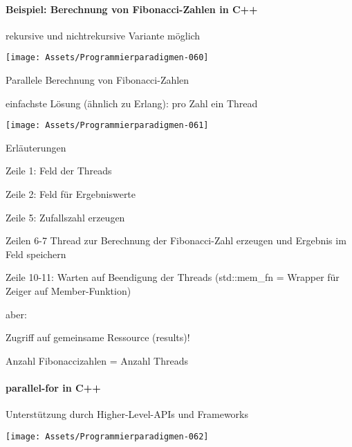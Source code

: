 \documentclass[10pt]{article}
\begin{document}
\paragraph{Beispiel: Berechnung von Fibonacci-Zahlen in C++}
\begin{itemize*}
  \item rekursive und nichtrekursive Variante möglich
\end{itemize*}
\begin{center}
  \texttt{[image: Assets/Programmierparadigmen-060]}
\end{center}

Parallele Berechnung von Fibonacci-Zahlen
\begin{itemize*}
  \item einfachste Lösung (ähnlich zu Erlang): pro Zahl ein Thread
\end{itemize*}
\begin{center}
  \texttt{[image: Assets/Programmierparadigmen-061]}
\end{center}

Erläuterungen
\begin{itemize*}
  \item Zeile 1: Feld der Threads
  \item Zeile 2: Feld für Ergebniswerte
  \item Zeile 5: Zufallszahl erzeugen
  \item Zeilen 6-7 Thread zur Berechnung der Fibonacci-Zahl erzeugen und Ergebnis im Feld speichern
  \item Zeile 10-11: Warten auf Beendigung der Threads (std::mem\_fn = Wrapper für Zeiger auf Member-Funktion)
  \item \color{orange} aber: \color{black}
  \begin{itemize*}
    \item Zugriff auf gemeinsame Ressource (results)!
    \item Anzahl Fibonaccizahlen = Anzahl Threads
  \end{itemize*}
\end{itemize*}

\paragraph{parallel-for in C++}
\begin{itemize*}
  \item Unterstützung durch Higher-Level-APIs und Frameworks
\end{itemize*}
\begin{center}
  \texttt{[image: Assets/Programmierparadigmen-062]}
\end{center}
\end{document}
